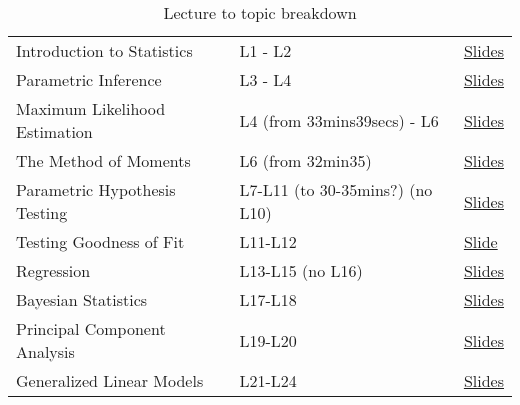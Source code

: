 \documentclass{article}
\begin{document}
\begin{table}[ht]
    \centering
    \begin{tabular}{l l l}
Introduction to Statistics & L1 - L2 & \href{https://ocw.mit.edu/courses/18-650-statistics-for-applications-fall-2016/7836ea6d101679d495194bc3c5f227fa_MIT18_650F16_Introduction.pdf}{Slides}\\
Parametric Inference & L3 - L4 & \href{https://ocw.mit.edu/courses/18-650-statistics-for-applications-fall-2016/335fd85c0a2ecffc49c781502b3d9b95_MIT18_650F16_Parametric_Inf.pdf}{Slides}\\
Maximum Likelihood Estimation & L4 (from 33mins39secs) - L6 & \href{https://ocw.mit.edu/courses/18-650-statistics-for-applications-fall-2016/36624c2682b346b07cab3da416b752a7_MIT18_650F16_Maximum_LE.pdf}{Slides}\\
The Method of Moments & L6 (from 32min35) & \href{https://ocw.mit.edu/courses/18-650-statistics-for-applications-fall-2016/d80691f22540361439d2e3e145d61783_MIT18_650F16_Method_of_Moments.pdf}{Slides}\\
Parametric Hypothesis Testing & L7-L11 (to 30-35mins?) (no L10) & \href{https://ocw.mit.edu/courses/18-650-statistics-for-applications-fall-2016/11b4116aa55b4e0288141bd40a39104f_MIT18_650F16_Parametric_HT.pdf}{Slides}\\
Testing Goodness of Fit & L11-L12 & \href{https://ocw.mit.edu/courses/18-650-statistics-for-applications-fall-2016/9ecfca905ca7a84c485cba65854fadb1_MIT18_650F16_Testing_GF.pdf}{Slide}\\
Regression & L13-L15 (no L16) & \href{https://ocw.mit.edu/courses/18-650-statistics-for-applications-fall-2016/2c0395a301a2ca798b1c0ee18cf6eedc_MIT18_650F16_Regression.pdf}{Slides}\\
Bayesian Statistics & L17-L18 & \href{https://ocw.mit.edu/courses/18-650-statistics-for-applications-fall-2016/84a7bb421c62e9edf6721c0bd2465361_MIT18_650F16_Bayesian_Statistics.pdf}{Slides}\\
Principal Component Analysis & L19-L20 & \href{https://ocw.mit.edu/courses/18-650-statistics-for-applications-fall-2016/d85e1a9d113142ade8ce5e4f5ef0b4e8_MIT18_650F16_PCA.pdf}{Slides}\\
Generalized Linear Models & L21-L24 & \href{https://ocw.mit.edu/courses/18-650-statistics-for-applications-fall-2016/dff89368051a5feae72b39c6422d0752_MIT18_650F16_GLM.pdf}{Slides}\\
    \end{tabular}
    \caption{Lecture to topic breakdown}
    \label{tab:my_label}
\end{table}
\end{document}
